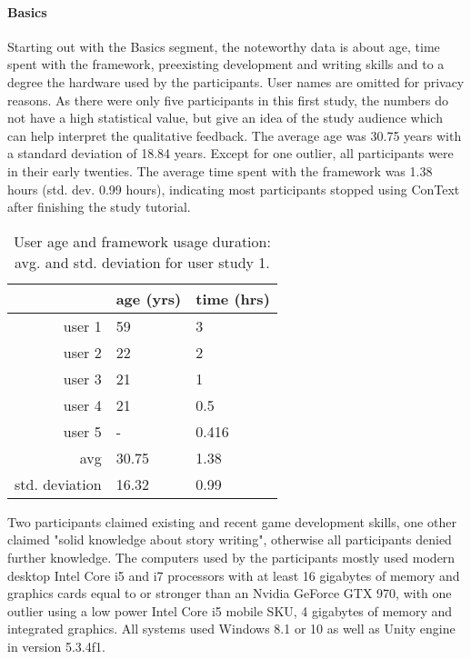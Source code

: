 \paragraph{Basics} 
Starting out with the Basics segment, the noteworthy data is about age, time spent with the framework, preexisting development and writing skills and to a degree the hardware used by the participants. User names are omitted for privacy reasons. 
As there were only five participants in this first study, the numbers do not have a high statistical value, but give an idea of the study audience which can help interpret the qualitative feedback. The average age was 30.75 years with a standard deviation of 18.84 years. Except for one outlier, all participants were in their early twenties. The average time spent with the framework was 1.38 hours (std. dev. 0.99 hours), indicating most participants stopped using ConText after finishing the study tutorial.
\begin{table}[htpb]
  \centering
  \begin{tabular}{r|l l}
       & \textbf{age} (yrs) & \textbf{time} (hrs) \\
    \midrule
      user 1 & 59 & 3 \\
      user 2 & 22 & 2 \\
      user 3 & 21 & 1 \\
      user 4 & 21 & 0.5 \\
      user 5 & - & 0.416 \\
      avg & 30.75 & 1.38 \\
      std. deviation & 16.32 & 0.99 \\
    \bottomrule
  \end{tabular}
  \caption[User study \#{}1 user age/time spent]{User age and framework usage duration: avg. and std. deviation for user study 1.}\label{tab:u1_age}
\end{table}
Two participants claimed existing and recent game development skills, one other claimed "solid knowledge about story writing", otherwise all participants denied further knowledge.
The computers used by the participants mostly used modern desktop Intel Core i5 and i7 processors with at least 16 gigabytes of memory and graphics cards equal to or stronger than an Nvidia GeForce GTX 970, with one outlier using a low power Intel Core i5 mobile SKU, 4 gigabytes of memory and integrated graphics. All systems used Windows 8.1 or 10 as well as Unity engine in version 5.3.4f1.
